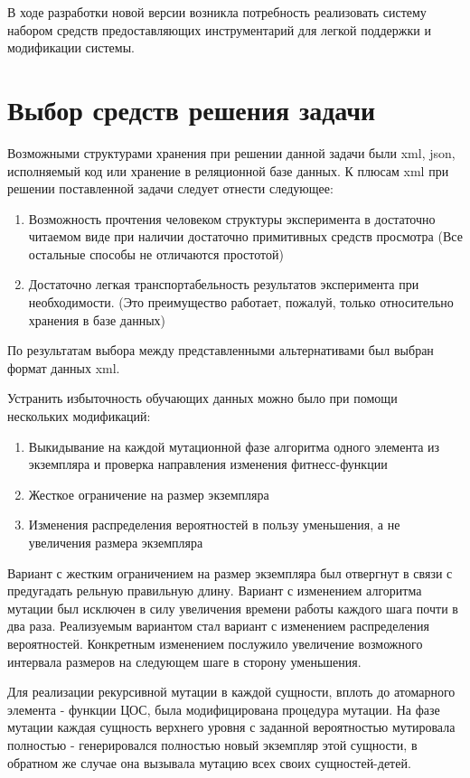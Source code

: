 \documentclass[utf8,usehyperref,12pt]{G7-32}
\begin{document}
В ходе разработки новой версии возникла потребность реализовать систему набором средств предоставляющих инструментарий для легкой поддержки и модификации системы.

\chapter{Выбор средств решения задачи}
Возможными структурами хранения при решении данной задачи были xml, json, исполняемый код или хранение в реляционной базе данных. К плюсам xml при решении поставленной задачи следует отнести следующее:
\begin{enumerate}
\item Возможность прочтения человеком структуры эксперимента в достаточно читаемом виде при наличии достаточно примитивных средств просмотра (Все остальные способы не отличаются простотой)
\item Достаточно легкая транспортабельность результатов эксперимента при необходимости. (Это преимущество работает, пожалуй, только относительно хранения в базе данных)
\end{enumerate}
По результатам выбора между представленными альтернативами был выбран формат данных xml.

Устранить избыточность обучающих данных можно было при помощи нескольких модификаций:
\begin{enumerate}
\item Выкидывание на каждой мутационной фазе алгоритма одного элемента из экземпляра и проверка направления изменения фитнесс-функции
\item Жесткое ограничение на размер экземпляра
\item Изменения распределения вероятностей в пользу уменьшения, а не увеличения размера экземпляра
\end{enumerate}
Вариант с жестким ограничением на размер экземпляра был отвергнут в связи с предугадать рельную правильную длину. Вариант с изменением алгоритма мутации был исключен в силу увеличения времени работы каждого шага почти в два раза. Реализуемым вариантом стал вариант с изменением распределения вероятностей. Конкретным изменением послужило увеличение возможного интервала размеров на следующем шаге в сторону уменьшения.

Для реализации рекурсивной мутации в каждой сущности, вплоть до атомарного элемента - функции ЦОС, была модифицирована процедура мутации. На фазе мутации каждая сущность верхнего уровня с заданной вероятностью мутировала полностью - генерировался полностью новый экземпляр этой сущности, в обратном же случае она вызывала мутацию всех своих сущностей-детей.
\end{document}
